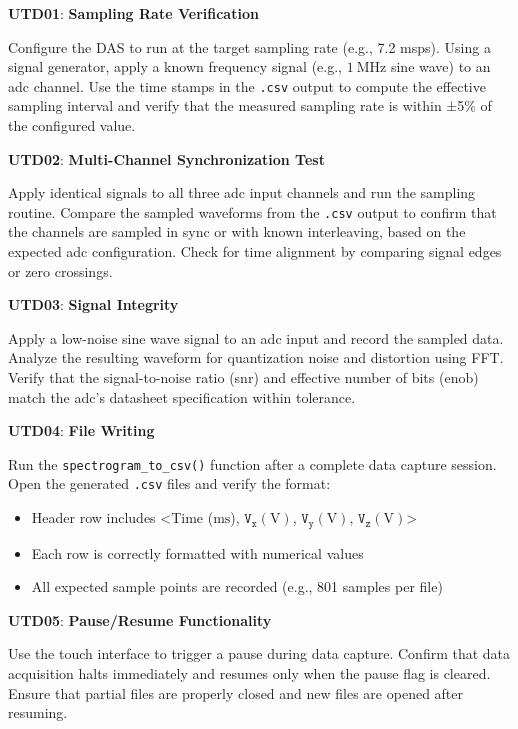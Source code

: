 \documentclass[class=report,11pt,crop=false]{standalone}
\begin{document}
	\begin{center}
		\textbf{UTD01}: \textbf{Sampling Rate Verification}
	\end{center}
	Configure the DAS to run at the target sampling rate (e.g., 7.2 \acrshort{msps}). Using a signal generator, apply a known frequency signal (e.g., $\SI{1}{\mega\hertz}$ sine wave) to an \acrshort{adc} channel. Use the time stamps in the \texttt{.csv} output to compute the effective sampling interval and verify that the measured sampling rate is within ±5\% of the configured value.
	
	\begin{center}
		\textbf{UTD02}: \textbf{Multi-Channel Synchronization Test}
	\end{center}
	Apply identical signals to all three \acrshort{adc} input channels and run the sampling routine. Compare the sampled waveforms from the \texttt{.csv} output to confirm that the channels are sampled in sync or with known interleaving, based on the expected \acrshort{adc} configuration. Check for time alignment by comparing signal edges or zero crossings.
	
	\begin{center}
		\textbf{UTD03}: \textbf{Signal Integrity}
	\end{center}
	Apply a low-noise sine wave signal to an \acrshort{adc} input and record the sampled data. Analyze the resulting waveform for quantization noise and distortion using FFT. Verify that the signal-to-noise ratio (\acrshort{snr}) and effective number of bits (\acrshort{enob}) match the \acrshort{adc}’s datasheet specification within tolerance.
	
	\begin{center}
		\textbf{UTD04}: \textbf{File Writing}
	\end{center}
	Run the \texttt{spectrogram\_to\_csv()} function after a complete data capture session. Open the generated \texttt{.csv} files and verify the format:
	\begin{itemize}
		\item Header row includes <Time ($\si{\milli\second}$), $\texttt{V}_\texttt{x} (\si{\volt})$, $\texttt{V}_\texttt{y} (\si{\volt})$, $\texttt{V}_\texttt{z} (\si{\volt})$>
		\item Each row is correctly formatted with numerical values
		\item All expected sample points are recorded (e.g., 801 samples per file)
	\end{itemize}
	
	\begin{center}
		\textbf{UTD05}: \textbf{Pause/Resume Functionality}
	\end{center}
	Use the touch interface to trigger a pause during data capture. Confirm that data acquisition halts immediately and resumes only when the pause flag is cleared. Ensure that partial files are properly closed and new files are opened after resuming.
	
\end{document}
